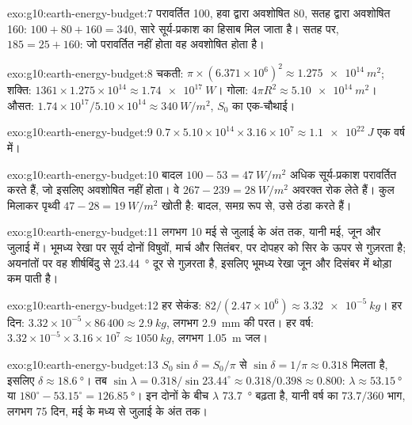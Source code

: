 \begin{solution}{exo:g10:earth-energy-budget:7}
परावर्तित 100, हवा द्वारा अवशोषित 80, सतह द्वारा अवशोषित 160:
$100 + 80 + 160 = 340$, सारे सूर्य-प्रकाश का हिसाब मिल जाता है। सतह पर,
$185 = 25 + 160$: जो परावर्तित नहीं होता वह अवशोषित होता है।
\end{solution}

\begin{solution}{exo:g10:earth-energy-budget:8}
चकती: $\pi \times (6.371\times10^6)^2 \approx \qty{1.275e14}{m^2}$; शक्ति:
$1361 \times 1.275\times10^{14} \approx \qty{1.74e17}{W}$। गोला: $4\pi
R^2 \approx \qty{5.10e14}{m^2}$। औसत: $1.74\times10^{17}/5.10\times
10^{14} \approx \qty{340}{W/m^2}$, $S_0$ का एक-चौथाई।
\end{solution}

\begin{solution}{exo:g10:earth-energy-budget:9}
$0.7 \times 5.10\times10^{14} \times 3.16\times10^7 \approx
\qty{1.1e22}{J}$ एक वर्ष में।
\end{solution}

\begin{solution}{exo:g10:earth-energy-budget:10}
बादल $100 - 53 = \qty{47}{W/m^2}$ अधिक सूर्य-प्रकाश परावर्तित करते हैं, जो इसलिए
अवशोषित नहीं होता। वे $267 - 239 = \qty{28}{W/m^2}$ अवरक्त रोक लेते हैं। कुल मिलाकर
पृथ्वी $47 - 28 = \qty{19}{W/m^2}$ खोती है: बादल,
समग्र रूप से, उसे ठंडा करते हैं।
\end{solution}

\begin{solution}{exo:g10:earth-energy-budget:11}
लगभग 10 मई से जुलाई के अंत तक, यानी मई, जून और जुलाई में। भूमध्य
रेखा पर सूर्य दोनों विषुवों, मार्च और सितंबर, पर दोपहर को सिर के ऊपर से गुज़रता है;
अयनांतों पर वह शीर्षबिंदु से \qty{23.44}{\degree} दूर से गुज़रता है, इसलिए भूमध्य रेखा
जून और दिसंबर में थोड़ा कम पाती है।
\end{solution}

\begin{solution}{exo:g10:earth-energy-budget:12}
हर सेकंड: $82/(2.47\times10^6) \approx \qty{3.32e-5}{kg}$। हर दिन:
$3.32\times10^{-5} \times 86\,400 \approx \qty{2.9}{kg}$, लगभग
\qty{2.9}{mm} की परत। हर वर्ष: $3.32\times10^{-5} \times 3.16\times10^7 \approx
\qty{1050}{kg}$, लगभग \qty{1.05}{m} जल।
\end{solution}

\begin{solution}{exo:g10:earth-energy-budget:13}
$S_0 \sin\delta = S_0/\pi$ से $\sin\delta = 1/\pi \approx 0.318$ मिलता है, इसलिए
$\delta \approx \qty{18.6}{\degree}$। तब $\sin\lambda = 0.318/\sin 23.44^\circ
\approx 0.318/0.398 \approx 0.800$: $\lambda \approx \qty{53.15}{\degree}$ या
$180^\circ - 53.15^\circ = \qty{126.85}{\degree}$। इन दोनों के बीच $\lambda$
\qty{73.7}{\degree} बढ़ता है, यानी वर्ष का $73.7/360$ भाग, लगभग
\num{75} दिन, मई के मध्य से जुलाई के अंत तक।
\end{solution}

